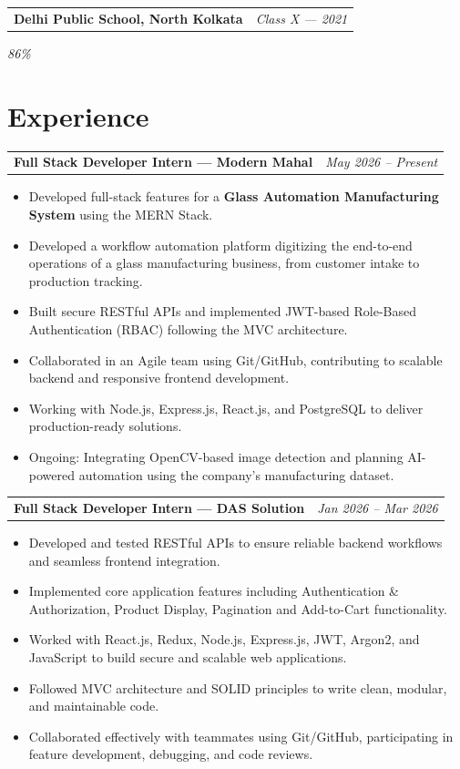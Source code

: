 \documentclass[10.5pt,a4paper]{article}
\makeatletter
\newcommand{\entry}[2]{%
  \vspace{3pt}
  \noindent
  \begin{tabularx}{\linewidth}{@{}X r@{}}
    \textbf{\color{darktext} #1} & \textit{\color{graytext}\small #2} \\
  \end{tabularx}
}
\newcommand{\subentry}[1]{%
  {\itshape\color{graytext}\small #1}\par\vspace{2pt}
}
\makeatother
\begin{document}
\entry{Delhi Public School, North Kolkata}{Class X --- 2021}
\subentry{86\%}

\section*{Experience}

\entry{Full Stack Developer Intern --- Modern Mahal}{May 2026 -- Present}
\begin{itemize}
    \item Developed full-stack features for a \textbf{Glass Automation Manufacturing System} using the MERN Stack.
    \item Developed a workflow automation platform digitizing the end-to-end operations of a glass manufacturing business, from customer intake to production tracking.
    \item Built secure RESTful APIs and implemented JWT-based Role-Based Authentication (RBAC) following the MVC architecture.
    \item Collaborated in an Agile team using Git/GitHub, contributing to scalable backend and responsive frontend development.
    \item Working with Node.js, Express.js, React.js, and PostgreSQL to deliver production-ready solutions.
    \item Ongoing: Integrating OpenCV-based image detection and planning AI-powered automation using the company's manufacturing dataset.
\end{itemize}

\entry{Full Stack Developer Intern --- DAS Solution}{Jan 2026 -- Mar 2026}
\begin{itemize}
    \item Developed and tested RESTful APIs to ensure reliable backend workflows and seamless frontend integration.
    \item Implemented core application features including Authentication \& Authorization, Product Display, Pagination and Add-to-Cart functionality.
    \item Worked with React.js, Redux, Node.js, Express.js, JWT, Argon2, and JavaScript to build secure and scalable web applications.
    \item Followed MVC architecture and SOLID principles to write clean, modular, and maintainable code.
    \item Collaborated effectively with teammates using Git/GitHub, participating in feature development, debugging, and code reviews.
\end{itemize}
\end{document}
